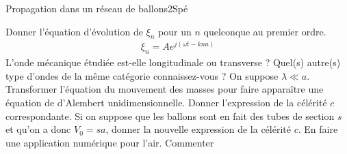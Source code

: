 \begin{exercise}{Propagation dans un réseau de ballons}{2}{Spé}
\begin{questions}
\begin{center}
    \end{center}
    Donner l'équation d'évolution de $\xi_n$ pour un $n$ quelconque au premier ordre.
    \begin{align*}
        \xi_n = A e^{j(\omega t - k n a)}
    \end{align*}
    \question L'onde mécanique étudiée est-elle longitudinale ou transverse ? Quel(s) autre(s) type d'ondes de la même catégorie connaissez-vous ?
    \question On suppose $\lambda \ll a$. Transformer l'équation du mouvement des masses pour faire apparaître une équation de d'Alembert unidimensionnelle. Donner l'expression de la célérité $c$ correspondante.
    \question Si on suppose que les ballons sont en fait des tubes de section $s$ et qu'on a donc $V_0 = sa$, donner la nouvelle expression de la célérité $c$. En faire une application numérique pour l'air. Commenter
\end{questions}

\end{exercise}